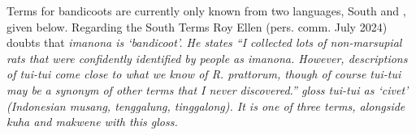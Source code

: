 Terms for bandicoots are currently only known from two languages,
South  and , given below.
Regarding the South  Terms Roy Ellen (pers. comm. July 2024) doubts
that \it{imanona} is ‘bandicoot’. He states “I collected lots of non-marsupial rats that were
confidently identified by people as \it{imanona}. However, descriptions of \it{tui-tui} come
close to what we know of \it{R. prattorum}, though of course \it{tui-tui} may be a synonym of
other terms that I never discovered.''
\citet{MatokeBolton2005} gloss \it{tui-tui} as `civet'
(Indonesian \it{musang, tenggalung},   \it{tinggalong}).
It is one of three terms, alongside \it{kuha} and \it{makwene} with this gloss.
\mbox{}\\

